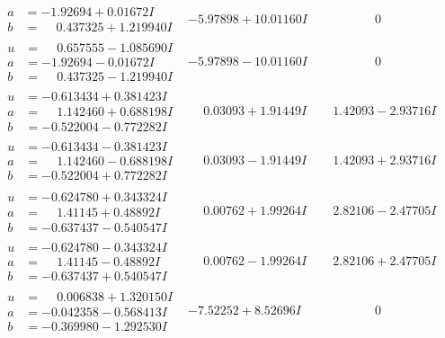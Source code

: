 \documentclass[1p]{elsarticle_modified}
\theoremstyle{definition}
\begin{document}
$$\begin{array}{c|c|c}
\begin{aligned}
a &= -1.92694 + 0.01672 I \\
b &= \phantom{-}0.437325 + 1.219940 I\end{aligned}
 & -5.97898 + 10.01160 I & \phantom{-0.000000 } 0 \\ \hline\begin{aligned}
u &= \phantom{-}0.657555 - 1.085690 I \\
a &= -1.92694 - 0.01672 I \\
b &= \phantom{-}0.437325 - 1.219940 I\end{aligned}
 & -5.97898 - 10.01160 I & \phantom{-0.000000 } 0 \\ \hline\begin{aligned}
u &= -0.613434 + 0.381423 I \\
a &= \phantom{-}1.142460 + 0.688198 I \\
b &= -0.522004 - 0.772282 I\end{aligned}
 & \phantom{-}0.03093 + 1.91449 I & \phantom{-}1.42093 - 2.93716 I \\ \hline\begin{aligned}
u &= -0.613434 - 0.381423 I \\
a &= \phantom{-}1.142460 - 0.688198 I \\
b &= -0.522004 + 0.772282 I\end{aligned}
 & \phantom{-}0.03093 - 1.91449 I & \phantom{-}1.42093 + 2.93716 I \\ \hline\begin{aligned}
u &= -0.624780 + 0.343324 I \\
a &= \phantom{-}1.41145 + 0.48892 I \\
b &= -0.637437 - 0.540547 I\end{aligned}
 & \phantom{-}0.00762 + 1.99264 I & \phantom{-}2.82106 - 2.47705 I \\ \hline\begin{aligned}
u &= -0.624780 - 0.343324 I \\
a &= \phantom{-}1.41145 - 0.48892 I \\
b &= -0.637437 + 0.540547 I\end{aligned}
 & \phantom{-}0.00762 - 1.99264 I & \phantom{-}2.82106 + 2.47705 I \\ \hline\begin{aligned}
u &= \phantom{-}0.006838 + 1.320150 I \\
a &= -0.042358 - 0.568413 I \\
b &= -0.369980 - 1.292530 I\end{aligned}
 & -7.52252 + 8.52696 I & \phantom{-0.000000 } 0 \\ \hline\begin{aligned}

\end{aligned}
\end{array}$$
\end{document}
